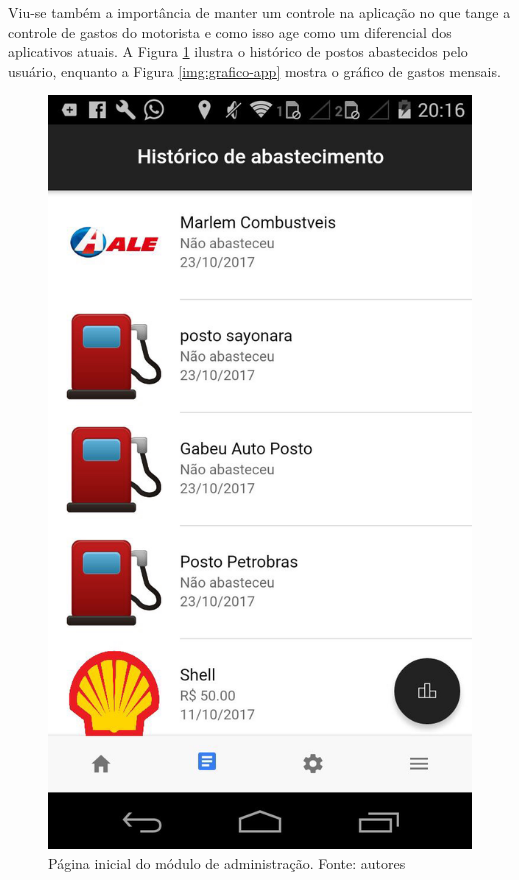 Viu-se também a importância de manter um controle na aplicação no que tange a controle de gastos do motorista e como isso age como um diferencial dos aplicativos atuais. A Figura \ref{img:historico-app} ilustra o histórico de postos abastecidos pelo usuário, enquanto a Figura \ref{img:grafico-app} mostra o gráfico de gastos mensais.

\begin{figure}[H]
    \centering
    \includegraphics[scale=0.3]{figuras/historico-app.jpg}
    \caption[Página inicial do módulo de administração]{Página inicial do módulo de administração. Fonte: autores}
    \label{img:historico-app}
\end{figure}

